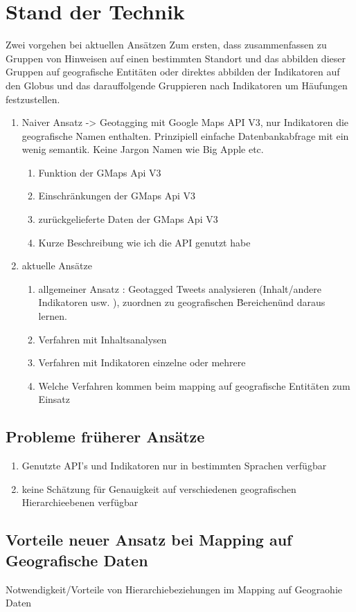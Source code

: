 	\section{Stand der Technik}
	Zwei vorgehen bei aktuellen Ansätzen
	Zum ersten, dass zusammenfassen zu Gruppen von Hinweisen auf einen bestimmten Standort und das abbilden dieser Gruppen auf geografische Entitäten oder direktes abbilden der Indikatoren auf den Globus und das darauffolgende Gruppieren nach Indikatoren um Häufungen festzustellen.   
		\begin{enumerate}
			\item Naiver Ansatz -> Geotagging mit Google Maps API V3, nur Indikatoren die geografische Namen enthalten. 
					Prinzipiell einfache Datenbankabfrage mit ein wenig semantik. 
					Keine Jargon Namen wie Big Apple etc.
				\begin{enumerate}
					\item Funktion der GMaps Api V3
					\item Einschränkungen der GMaps Api V3
					\item zurückgelieferte Daten der GMaps Api V3
					\item Kurze Beschreibung wie ich die API genutzt habe
				\end{enumerate}
			\item aktuelle Ansätze
				\begin{enumerate}
					\item{ 
					allgemeiner Ansatz : Geotagged Tweets analysieren (Inhalt/andere Indikatoren usw. ), zuordnen zu geografischen \"Bereichen\" und daraus lernen.}
					\item Verfahren mit Inhaltsanalysen
					\item Verfahren mit Indikatoren einzelne oder mehrere
					\item Welche Verfahren kommen beim mapping auf  geografische Entitäten zum Einsatz
				\end{enumerate}
		\end{enumerate}

		\subsection{Probleme früherer Ansätze}
			\begin{enumerate}
				\item{Genutzte API's und Indikatoren nur in bestimmten Sprachen verfügbar}
				\item{keine Schätzung für Genauigkeit auf verschiedenen geografischen Hierarchieebenen verfügbar}  
			\end{enumerate}

		\subsection{Vorteile neuer Ansatz bei Mapping auf Geografische Daten}
		
		Notwendigkeit/Vorteile von Hierarchiebeziehungen im Mapping auf Geograohie Daten